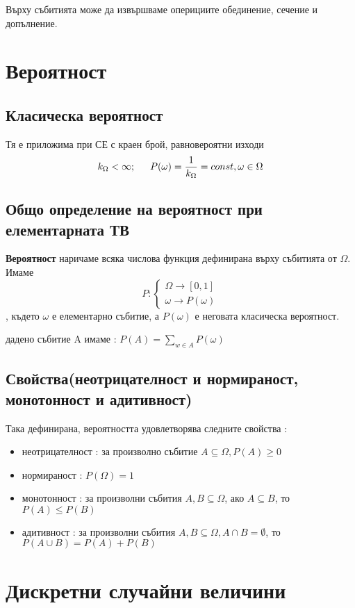 \documentclass[fleqn,12pt]{article}
\begin{document}
\begin{justify}
Върху събитията може да извършваме оперициите обединение, сечение и допълнение.

\section{Вероятност}
\subsection{Класическа вероятност}
Тя е приложима при СЕ с краен брой, равновероятни изходи
\begin{gather*}
    k_\Omega < \infty; \indent P(\omega) = \frac{1}{k_\Omega} = const, \omega \in \Omega
\end{gather*}
\subsection{Общо определение на вероятност при елементарната ТВ}
\textbf{Вероятност} наричаме всяка числова функция дефинирана върху събитията от $\Omega$. Имаме
\[P : \begin{cases}
    \Omega \rightarrow [0, 1]\\
    \omega \rightarrow P(\omega)
\end{cases}
\]
, където $\omega$ е елементарно събитие, а $P(\omega)$ е неговата класическа вероятност.

 дадено събитие A имаме : $P(A) = \sum_{w \in A} P(\omega)$
    
\subsection{Свойства(неотрицателност и нормираност, монотонност и адитивност)}
Така дефинирана, вероятността удовлетворява следните свойства : 
\begin{itemize}
    \item неотрицателност : за произволно събитие $A \subseteq \Omega, P(A) \geq 0$
    \item нормираност : $P(\Omega) = 1$
    \item монотонност : за произволни събития $A,B \subseteq \Omega$, ако $A \subseteq B$, то $P(A) \leq P(B)$
    \item адитивност : за произволни събития $A,B \subseteq \Omega, A \cap B = \emptyset$, то $P(A \cup B) = P(A) + P(B)$
\end{itemize}

\section{Дискретни случайни величини}

\end{justify}
\end{document}
